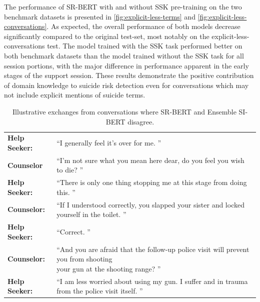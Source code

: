 \documentclass[letterpaper]{article} %
\begin{document}

The performance of SR-BERT with and without SSK pre-training  on the two benchmark datasets is presented in \autoref{fig:explicit-less-terms} and \autoref{fig:explicit-less-conversations}. As expected, the overall performance of both models decrease significantly compared to the original test-set, most notably on the explicit-less-conversations test. The model trained with the SSK task performed better on both benchmark datasets  than the model trained without the SSK task for all session portions, with the major difference in performance apparent in the early stages of the support session. These results demonstrate the positive contribution of domain knowledge to suicide risk detection even for conversations which may not include explicit mentions of suicide terms. 
\begin{table}[]
\caption{Illustrative exchanges from conversations where SR-BERT and Ensemble SI-BERT disagree.}
\centering
\begin{tabular}{ll}
\hline
\textbf{Help Seeker:}  &  ``I generally feel it’s over for me. ''                                                      \\
\textbf{Counselor} & ``I’m not sure what you mean here dear, do you feel  you wish to die? '' \\
\textbf{Help Seeker:}  & ``There is only one thing stopping me at this stage from doing this.    ''                  \\
\hline
\hline
\textbf{Counselor:} &
``If I understood correctly, you slapped your sister and locked yourself in the toilet. ''\\
\textbf{Help Seeker:} & ``Correct. ''
\\
\textbf{Counselor:} & \makecell[l]{
``And you are afraid that the follow-up police visit will prevent you from shooting \\ your gun at the shooting range? ''}
\\
\textbf{Help Seeker:} & 
``I am less worried about using my gun. I suffer and in trauma from the police visit itself. ''
\\ \hline
\end{tabular}
\label{tab:examples}

\end{table}
\end{document}
